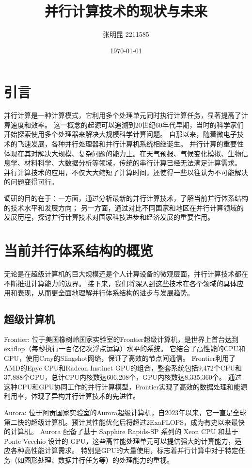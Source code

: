 \documentclass{ctexart}
\title{并行计算技术的现状与未来}
\author{张明昆 2211585}
\date{\today}
\begin{document}
\maketitle
\tableofcontents
\section{引言}
并行计算是一种计算模式，它利用多个处理单元同时执行计算任务，显著提高了计算速度和效率。
这一概念的起源可以追溯到20世纪60年代早期，当时的科学家们开始探索使用多个处理器来解决大规模科学计算问题。
自那以来，随着微电子技术的飞速发展，各种并行处理器和并行计算机系统相继诞生。
并行计算的重要性体现在其对解决大规模、复杂问题的能力上。在天气预报、气候变化模拟、生物信息学、材料科学、大数据分析等领域，传统的串行计算已经无法满足计算需求。
并行计算技术的应用，不仅大大缩短了计算时间，还使得一些以往认为不可能解决的问题变得可行。

调研的目的在于：一方面，通过分析最新的并行计算技术，了解当前并行体系结构的技术水平和发展方向；
另一方面，通过对比不同国家和地区在并行计算领域的发展历程，探讨并行计算技术对国家科技进步和经济发展的重要作用。
\section{当前并行体系结构的概览}
无论是在超级计算机的巨大规模还是个人计算设备的微观层面，并行计算技术都在不断推进计算能力的边界。
接下来，我们将深入到这些技术在各个领域的具体应用和表现，从而更全面地理解并行体系结构的进步与发展趋势。
\subsection{超级计算机}
Frontier: 位于美国橡树岭国家实验室的Frontier超级计算机，是世界上首台达到exaflop（每秒执行一百亿亿次浮点运算）水平的系统。
它结合了高性能的CPU和GPU，使用Cray的Slingshot网络，保证了高效的节点间通信。
Frontier利用了AMD的Epyc CPU和Radeon Instinct GPU的组合，整套系统包括9,472个CPU和37,888个GPU，总计CPU内核数达606,208个，GPU内核数达8,335,360个。 \cite{choi2022beating}
通过这种CPU和GPU协同工作的并行计算模型，Frontier实现了高效的数据处理和能源利用率，体现了异构并行计算技术的先进性。

Aurora: 位于阿贡国家实验室的Aurora超级计算机，自2023年以来，它一直是全球第二快的超级计算机。预计其性能优化后将超过2ExaFLOPS，成为有史以来最快的计算机。\cite{intel2023datacenter}
Aurora 配备了基于 Sapphire Rapids-SP 系列的 Xeon CPU 和基于 Ponte Vecchio 设计的 GPU，这些高性能处理单元可以提供强大的计算能力，适应各种高性能计算需求。
特别是GPU的大量使用，标志着并行计算中对于特定任务（如图形处理、数据并行任务等）的处理能力的重视。
\end{document}
